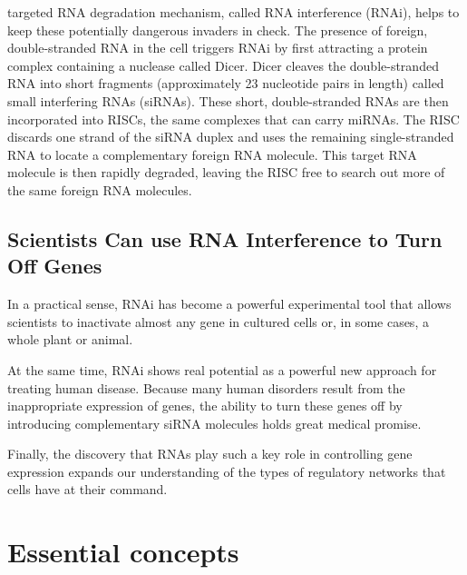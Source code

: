 targeted RNA degradation mechanism, called RNA interference (RNAi), helps to keep these
potentially dangerous invaders in check.
The presence of foreign, double-stranded RNA in the cell triggers RNAi by
first attracting a protein complex containing a nuclease called Dicer. Dicer
cleaves the double-stranded RNA into short fragments (approximately 23 nucleotide
pairs in length) called small interfering RNAs (siRNAs).
These short, double-stranded RNAs are then incorporated into RISCs, the
same complexes that can carry miRNAs. The RISC discards one strand of
the siRNA duplex and uses the remaining single-stranded RNA to locate
a complementary foreign RNA molecule. This target RNA
molecule is then rapidly degraded, leaving the RISC free to search out
more of the same foreign RNA molecules.

\subsection{Scientists Can use RNA Interference to Turn Off Genes}

In a practical sense, RNAi has become a powerful experimental tool that allows scientists to inactivate almost
any gene in cultured cells or, in some cases, a whole plant or animal.

At the same time, RNAi shows real potential as a powerful new approach
for treating human disease. Because many human disorders result from
the inappropriate expression of genes, the ability to turn these genes off
by introducing complementary siRNA molecules holds great medical
promise.

Finally, the discovery that RNAs play such a key role in controlling gene
expression expands our understanding of the types of regulatory networks
that cells have at their command.

\section{Essential concepts}

